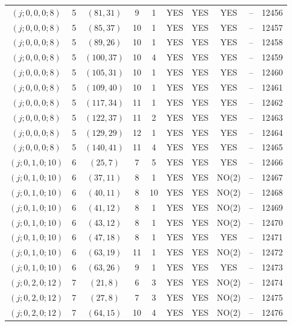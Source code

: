 \begin{longtable}{|c|c|c|c|c|c|c|c|c|c|}
$(j; 0, 0, 0; 8)$ & 5 & $(81, 31)$ & 9 & 1 & YES & YES & YES & -- & 12456\\
$(j; 0, 0, 0; 8)$ & 5 & $(85, 37)$ & 10 & 1 & YES & YES & YES & -- & 12457\\
$(j; 0, 0, 0; 8)$ & 5 & $(89, 26)$ & 10 & 1 & YES & YES & YES & -- & 12458\\
$(j; 0, 0, 0; 8)$ & 5 & $(100, 37)$ & 10 & 4 & YES & YES & YES & -- & 12459\\
$(j; 0, 0, 0; 8)$ & 5 & $(105, 31)$ & 10 & 1 & YES & YES & YES & -- & 12460\\
$(j; 0, 0, 0; 8)$ & 5 & $(109, 40)$ & 10 & 1 & YES & YES & YES & -- & 12461\\
$(j; 0, 0, 0; 8)$ & 5 & $(117, 34)$ & 11 & 1 & YES & YES & YES & -- & 12462\\
$(j; 0, 0, 0; 8)$ & 5 & $(122, 37)$ & 11 & 2 & YES & YES & YES & -- & 12463\\
$(j; 0, 0, 0; 8)$ & 5 & $(129, 29)$ & 12 & 1 & YES & YES & YES & -- & 12464\\
$(j; 0, 0, 0; 8)$ & 5 & $(140, 41)$ & 11 & 4 & YES & YES & YES & -- & 12465\\
$(j; 0, 1, 0; 10)$ & 6 & $(25, 7)$ & 7 & 5 & YES & YES & YES & -- & 12466\\
$(j; 0, 1, 0; 10)$ & 6 & $(37, 11)$ & 8 & 1 & YES & YES & NO(2) & -- & 12467\\
$(j; 0, 1, 0; 10)$ & 6 & $(40, 11)$ & 8 & 10 & YES & YES & NO(2) & -- & 12468\\
$(j; 0, 1, 0; 10)$ & 6 & $(41, 12)$ & 8 & 1 & YES & YES & NO(2) & -- & 12469\\
$(j; 0, 1, 0; 10)$ & 6 & $(43, 12)$ & 8 & 1 & YES & YES & NO(2) & -- & 12470\\
$(j; 0, 1, 0; 10)$ & 6 & $(47, 18)$ & 8 & 1 & YES & YES & YES & -- & 12471\\
$(j; 0, 1, 0; 10)$ & 6 & $(63, 19)$ & 11 & 1 & YES & YES & NO(2) & -- & 12472\\
$(j; 0, 1, 0; 10)$ & 6 & $(63, 26)$ & 9 & 1 & YES & YES & YES & -- & 12473\\
$(j; 0, 2, 0; 12)$ & 7 & $(21, 8)$ & 6 & 3 & YES & YES & NO(2) & -- & 12474\\
$(j; 0, 2, 0; 12)$ & 7 & $(27, 8)$ & 7 & 3 & YES & YES & NO(2) & -- & 12475\\
$(j; 0, 2, 0; 12)$ & 7 & $(64, 15)$ & 10 & 4 & YES & YES & NO(2) & -- & 12476
\end{longtable}
